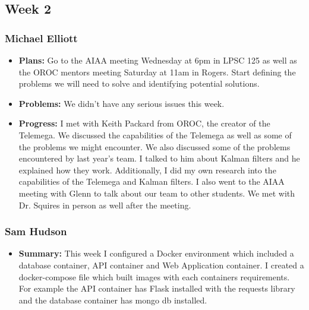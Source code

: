 \documentclass[onecolumn, draftclsnofoot,10pt, compsoc]{IEEEtran}
\begin{document}
\subsection {Week 2}
\subsubsection{Michael Elliott}
\begin {itemize}
\item \textbf{Plans: }
  Go to the AIAA meeting Wednesday at 6pm in LPSC 125 as well as the OROC mentors meeting Saturday at 11am in Rogers. Start defining the problems we will need to solve and identifying potential solutions.
\item \textbf{Problems: }
  We didn't have any serious issues this week.
\item \textbf{Progress: }
  I met with Keith Packard from OROC, the creator of the Telemega. We discussed the capabilities of the Telemega as well as some of the problems we might encounter. We also discussed some of the problems encountered by last year's team. I talked to him about Kalman filters and he explained how they work. Additionally, I did my own research into the capabilities of the Telemega and Kalman filters. I also went to the AIAA meeting with Glenn to talk about our team to other students. We met with Dr. Squires in person as well after the meeting.
\end {itemize}
\subsubsection{Sam Hudson}
\begin {itemize}
\item \textbf{Summary: }This week I configured a Docker environment which included a database container, API container and Web Application container. I created a docker-compose file which built images with each containers requirements. For example the API container has Flask installed with the requests library and the database container has mongo db installed.
\end {itemize}
\end{document}

